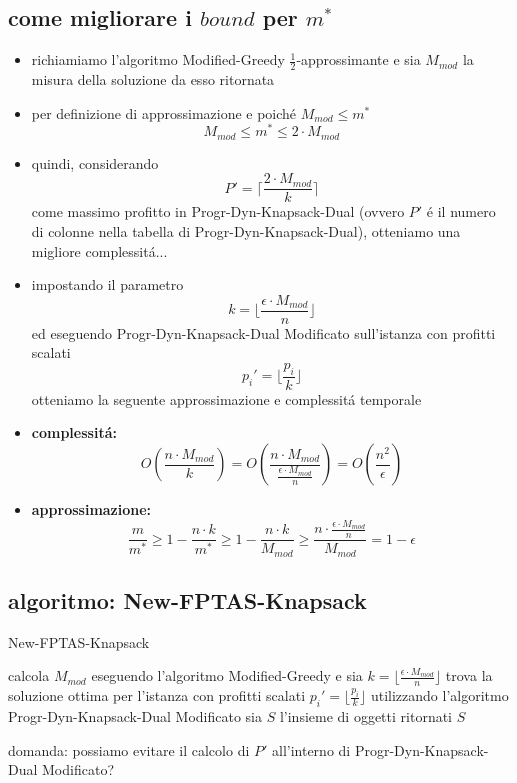 \subsection*{come migliorare i $bound$ per $m^*$}
\begin{flushleft}
	\begin{itemize}
		\item richiamiamo l'algoritmo Modified-Greedy $\frac{1}{2}$-approssimante e sia $M_{mod}$ la misura della soluzione da esso ritornata
		\item per definizione di approssimazione e poich\'e $M_{mod}\leq m^*$
			$$M_{mod}\leq m^*\leq 2\cdot M_{mod}$$
		\item quindi, considerando
			$$P'=\lceil\frac{2\cdot M_{mod}}{k}\rceil$$
			come massimo profitto in Progr-Dyn-Knapsack-Dual (ovvero $P'$ \'e il numero di colonne
			nella tabella di Progr-Dyn-Knapsack-Dual), otteniamo una migliore complessit\'a...
		\item impostando il parametro
			$$k=\lfloor\frac{\epsilon\cdot M_{mod}}{n}\rfloor$$
			ed eseguendo Progr-Dyn-Knapsack-Dual Modificato sull'istanza con profitti scalati
			$$p_i'=\lfloor\frac{p_i}{k}\rfloor$$
			otteniamo la seguente approssimazione e complessit\'a temporale
		\item \textbf{complessit\'a:}
			$$O(\frac{n\cdot M_{mod}}{k})=O(\frac{n\cdot M_{mod}}{\frac{\epsilon\cdot M_{mod}}{n}})=O(\frac{n^2}{\epsilon})$$
		\item \textbf{approssimazione:}
			$$\frac{m}{m^*}\geq 1-\frac{n\cdot k}{m^*}\geq 1-\frac{n\cdot k}{M_{mod}}\geq \frac{n\cdot\frac{\epsilon\cdot M_{mod}}{n}}{M_{mod}}=1-\epsilon$$
	\end{itemize}
\end{flushleft}


\subsection*{algoritmo: New-FPTAS-Knapsack}
\begin{flushleft}
	\begin{algorithm}
		\caption{New-FPTAS-Knapsack}
		\begin{algorithmic}
			\STATE calcola $M_{mod}$ eseguendo l'algoritmo Modified-Greedy e sia $k=\lfloor\frac{\epsilon\cdot M_{mod}}{n}\rfloor$
			\STATE trova la soluzione ottima per l'istanza con profitti scalati $p_i'=\lfloor\frac{p_i}{k}\rfloor$ utilizzando l'algoritmo Progr-Dyn-Knapsack-Dual Modificato
			\STATE sia $S$ l'insieme di oggetti ritornati
			\RETURN $S$
		\end{algorithmic}
	\end{algorithm}
	\item domanda: possiamo evitare il calcolo di $P'$ all'interno di Progr-Dyn-Knapsack-Dual Modificato?
\end{flushleft}


\newpage
